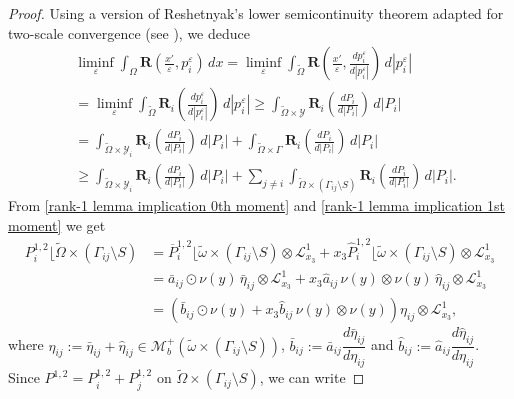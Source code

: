 \documentclass[reqno,10pt]{amsart}
\numberwithin{equation}{section}
\theoremstyle{remark}
\newcommand{\calL}{\mathcal{L}}
\newcommand{\R}{\mathbb{R}}
\newcommand{\calY}{\mathcal{Y}}
\newcommand{\eps}{\varepsilon}
\newcommand{\zerothI}[1]{\overline{#1}}
\newcommand{\firstI}[1]{\widehat{#1}}
\newcommand{\Mb}{\mathcal{M}_b}
\newcommand{\mres}[1]{\lfloor{#1}}
\newcommand{\ext}[1]{\widetilde{#1}}
\newcommand{\disspot}{\mathbf{R}}
\begin{document}
\begin{proof}
Using a version of Reshetnyak's lower semicontinuity theorem adapted for two-scale convergence (see \cite[Lemma 4.6]{Francfort.Giacomini.2014}), we deduce
\begin{align} \label{R liminf}
	\nonumber & \liminf\limits_{\eps} \int_{\Omega} \disspot\!\left(\frac{x'}{\eps}, p^\eps_{i}\right) \,dx = \liminf\limits_{\eps} \int_{\ext{\Omega}} \disspot\!\left(\frac{x'}{\eps}, \frac{dp^\eps_{i}}{d|p^\eps_{i}|}\right) \,d|p^\eps_{i}|\\
	\nonumber & = \liminf\limits_{\eps} \int_{\ext{\Omega}} \disspot_i\!\left(\frac{dp^\eps_{i}}{d|p^\eps_{i}|}\right) \,d|p^\eps_{i}|
	\geq \int_{\ext{\Omega} \times \calY} \disspot_i\!\left(\frac{dP_{i}}{d|P_{i}|}\right) \,d|P_{i}|\\
	\nonumber & = \int_{\ext{\Omega} \times \calY_i} \disspot_i\!\left(\frac{dP_{i}}{d|P_{i}|}\right) \,d|P_{i}| + \int_{\ext{\Omega} \times \Gamma} \disspot_i\!\left(\frac{dP_{i}}{d|P_{i}|}\right) \,d|P_{i}|\\
	& \geq \int_{\ext{\Omega} \times \calY_i} \disspot_i\!\left(\frac{dP_{i}}{d|P_{i}|}\right) \,d|P_{i}| + \sum_{j \neq i} \int_{\ext{\Omega} \times (\Gamma_{ij} \setminus S)} \disspot_i\!\left(\frac{dP_{i}}{d|P_{i}|}\right) \,d|P_{i}|.
\end{align}
From \eqref{rank-1 lemma implication 0th moment} and \eqref{rank-1 lemma implication 1st moment} we get
\begin{align*}
	P_{i}^{1,2}\mres{\ext{\Omega} \times (\Gamma_{ij} \setminus S)} 
	& = \zerothI{P}_{i}^{1,2}\mres{\ext{\omega} \times (\Gamma_{ij} \setminus S)} \otimes \calL^{1}_{x_3} + x_3 \firstI{P}_{i}^{1,2}\mres{\ext{\omega} \times (\Gamma_{ij} \setminus S)} \otimes \calL^{1}_{x_3}
	\\& = \bar{a}_{ij} \odot \nu(y) \,\bar{\eta}_{ij} \otimes \calL^{1}_{x_3} + x_3 \hat{a}_{ij}\, \nu(y) \otimes \nu(y) \,\hat{\eta}_{ij} \otimes \calL^{1}_{x_3}
	\\& = \!\left( \bar{b}_{ij} \odot \nu(y) + x_3 \hat{b}_{ij}\, \nu(y) \otimes \nu(y) \right) \eta_{ij} \otimes \calL^{1}_{x_3},
\end{align*}
where $\eta_{ij} := \bar{\eta}_{ij} + \hat{\eta}_{ij} \in \Mb^+ (\ext{\omega} \times (\Gamma_{ij} \setminus S))$, 
$\bar{b}_{ij} := \bar{a}_{ij}\dfrac{d\bar{\eta}_{ij}}{d\eta_{ij}}$ and $\hat{b}_{ij} := \hat{a}_{ij}\dfrac{d\hat{\eta}_{ij}}{d\eta_{ij}}$.
Since $P^{1,2} = P_{i}^{1,2} + P_{j}^{1,2}$ on $\ext{\Omega} \times (\Gamma_{ij} \setminus S)$, we can write

\end{proof}
\end{document}
